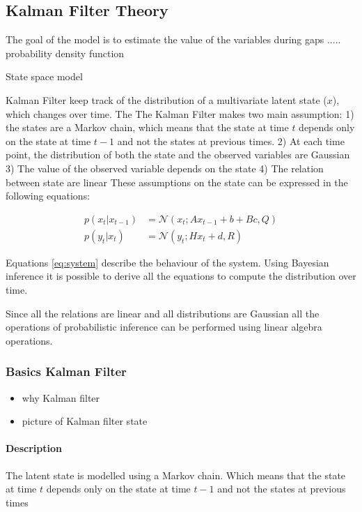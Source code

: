 \documentclass{article}
\newcommand{\norm}[3]{\mathcal{N}\left(#1; #2, #3\right)} %
\let\Oldsubsection\subsection
\renewcommand{\subsection}{\FloatBarrier\Oldsubsection}
\let\Oldsubsubsection\subsubsection
\renewcommand{\subsubsection}{\FloatBarrier\Oldsubsubsection}
\begin{document}
\subsection{Kalman Filter Theory}

The goal of the model is to estimate the value of the variables during gaps .....
probability density function

State space model

Kalman Filter keep track of the distribution of a multivariate latent state ($x$), which changes over time. The 
The Kalman Filter makes two main assumption: 1) the states are a Markov chain, which means that the state at time $t$ depends only on the state at time $t-1$ and not the states at previous times. 2) At each time point, the distribution of both the state and the observed variables are Gaussian  3) The value of the observed variable depends on the state 4) The relation between state are linear
These assumptions on the state can be expressed in the following equations:

\begin{align}\label{eq:system}
p(x_t | x_{t-1}) &= \norm{x_t}{Ax_{t-1} + b + Bc}{Q} \\
p(y_t | x_t) &= \norm{y_t}{Hx_t + d}{R}
\end{align}

Equations \ref{eq:system} describe the behaviour of the system. Using Bayesian inference it is possible to derive all the equations to compute the distribution over time.

Since all the relations are linear and all distributions are Gaussian all the operations of probabilistic inference can be performed using linear algebra operations. 

\subsubsection{Basics Kalman Filter}

\begin{itemize}
    \item why Kalman filter
    \item picture of Kalman filter state
\end{itemize}

\paragraph{Description}

The latent state  is modelled using a Markov chain. Which means that the state at time $t$ depends only on the state at time $t-1$ and not the states at previous times
\end{document}

